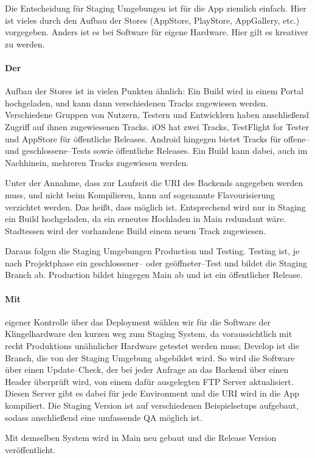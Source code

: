 Die Entscheidung für Staging Umgebungen ist für die App ziemlich einfach.
Hier ist vieles durch den Aufbau der Stores (AppStore, PlayStore, AppGallery, etc.) vorgegeben.
Anders ist es bei Software für eigene Hardware.
Hier gilt es kreativer zu werden.


\paragraph{\large{Der}} Aufbau der Stores ist in vielen Punkten ähnlich:
    Ein Build wird in einem Portal hochgeladen, und kann dann verschiedenen Tracks zugewiesen werden.
    Verschiedene Gruppen von Nutzern, Testern und Entwicklern haben anschließend Zugriff auf ihnen zugewiesenen Tracks.
    iOS hat zwei Tracks, TestFlight for Tester und AppStore für öffentliche Releases.
    Android hingegen bietet Tracks für offene-- und geschlossene--Tests sowie öffentliche Releases.
    Ein Build kann dabei, auch im Nachhinein, mehreren Tracks zugewiesen werden.


    Unter der Annahme, dass zur Laufzeit die URI des Backends angegeben werden muss, und nicht beim Kompilieren, kann auf sogenannte Flavourisierung verzichtet werden.
    Das heißt, dass  möglich ist.
    Entsprechend wird nur in Staging ein Build hochgeladen, da ein erneutes Hochladen in Main redundant wäre.
    Stadtessen wird der vorhandene Build einem neuen Track zugewiesen.


    Daraus folgen die Staging Umgebungen Production und Testing.
    Testing ist, je nach Projektphase ein geschlossener-- oder geöffneter--Test und bildet die Staging Branch ab.
    Production bildet hingegen Main ab und ist ein öffentlicher Release.


\paragraph{\large{Mit}} eigener Kontrolle über das Deployment wählen wir für die Software der Klingelhardware den kurzen weg zum Staging System, da voraussichtlich mit recht Produktions unähnlicher Hardware getestet werden muss;
    Develop ist die Branch, die von der Staging Umgebung abgebildet wird.
    So wird die Software über einen Update--Check, der bei jeder Anfrage an das Backend über einen Header überprüft wird, von einem dafür ausgelegten FTP Server aktualisiert.
    Diesen Server gibt es dabei für jede Environment und die URI wird in die App kompiliert.
    Die Staging Version ist auf verschiedenen Beispielsetups aufgebaut, sodass anschließend eine umfassende QA möglich ist.


    Mit demselben System wird in Main neu gebaut und die Release Version veröffentlicht.